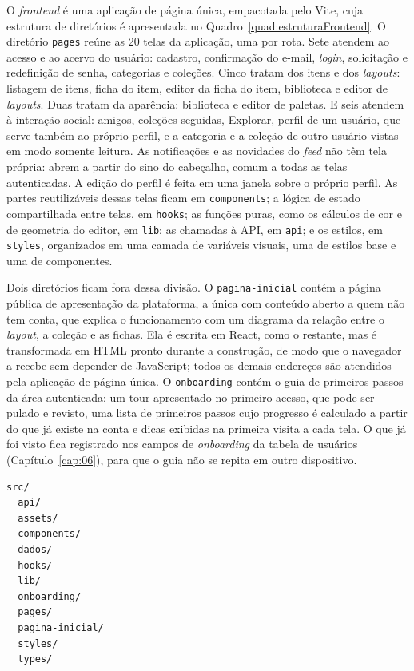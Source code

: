 O \textit{frontend} é uma aplicação de página única, empacotada pelo Vite, cuja estrutura de diretórios é apresentada no Quadro~\ref{quad:estruturaFrontend}. O diretório \texttt{pages} reúne as 20 telas da aplicação, uma por rota. Sete atendem ao acesso e ao acervo do usuário: cadastro, confirmação do e-mail, \textit{login}, solicitação e redefinição de senha, categorias e coleções. Cinco tratam dos itens e dos \textit{layouts}: listagem de itens, ficha do item, editor da ficha do item, biblioteca e editor de \textit{layouts}. Duas tratam da aparência: biblioteca e editor de paletas. E seis atendem à interação social: amigos, coleções seguidas, Explorar, perfil de um usuário, que serve também ao próprio perfil, e a categoria e a coleção de outro usuário vistas em modo somente leitura. As notificações e as novidades do \textit{feed} não têm tela própria: abrem a partir do sino do cabeçalho, comum a todas as telas autenticadas. A edição do perfil é feita em uma janela sobre o próprio perfil. As partes reutilizáveis dessas telas ficam em \texttt{components}; a lógica de estado compartilhada entre telas, em \texttt{hooks}; as funções puras, como os cálculos de cor e de geometria do editor, em \texttt{lib}; as chamadas à API, em \texttt{api}; e os estilos, em \texttt{styles}, organizados em uma camada de variáveis visuais, uma de estilos base e uma de componentes.

Dois diretórios ficam fora dessa divisão. O \texttt{pagina-inicial} contém a página pública de apresentação da plataforma, a única com conteúdo aberto a quem não tem conta, que explica o funcionamento com um diagrama da relação entre o \textit{layout}, a coleção e as fichas. Ela é escrita em React, como o restante, mas é transformada em HTML pronto durante a construção, de modo que o navegador a recebe sem depender de JavaScript; todos os demais endereços são atendidos pela aplicação de página única. O \texttt{onboarding} contém o guia de primeiros passos da área autenticada: um tour apresentado no primeiro acesso, que pode ser pulado e revisto, uma lista de primeiros passos cujo progresso é calculado a partir do que já existe na conta e dicas exibidas na primeira visita a cada tela. O que já foi visto fica registrado nos campos de \textit{onboarding} da tabela de usuários (Capítulo~\ref{cap:06}), para que o guia não se repita em outro dispositivo.

\FloatBarrier
\begin{quadro}[h!]
\caption{Estrutura de diretórios do \textit{frontend}}
\label{quad:estruturaFrontend}
\centering
\begin{minipage}{0.6\textwidth}
\begin{lstlisting}[numbers=none]
src/
  api/
  assets/
  components/
  dados/
  hooks/
  lib/
  onboarding/
  pages/
  pagina-inicial/
  styles/
  types/
\end{lstlisting}
\end{minipage}
\end{quadro}
\FloatBarrier

